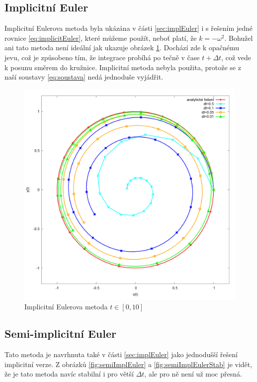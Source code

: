\subsection{Implicitní Euler}
Implicitní Eulerova metoda byla ukázána v části \ref{sec:implEuler} i s řešením jedné rovnice \eqref{eq:implicitEuler}, které můžeme použít, neboť platí, že $ k=-\omega^2 $. 
Bohužel ani tato metoda není ideální jak ukazuje obrázek \ref{fig:implicitEuler}. Dochází zde k opačnému jevu, což je způsobeno tím, že integrace probíhá po tečně v čase $ t+\Delta t $, což vede k posunu směrem do kružnice. Implicitní metoda nebyla použita, protože se z naší soustavy \eqref{eq:soustava} nedá jednoduše vyjádřit.
\begin{figure}
	\caption{Implicitní Eulerova metoda $ t\in [0,10] $}
	\label{fig:implicitEuler} 
	\centering
	\includegraphics[width=\linewidth]{Figs/implicitEuler}
\end{figure}
\subsection{Semi-implicitní Euler}
Tato metoda je navrhnuta také v části \ref{sec:implEuler} jako jednodušší řešení implicitní verze. Z obrázků \ref{fig:semiImplEuler} a \ref{fig:semiImplEulerStab} je vidět, že je tato metoda navíc stabilní i pro větší $ \Delta t $, ale pro ně není už moc přesná.

